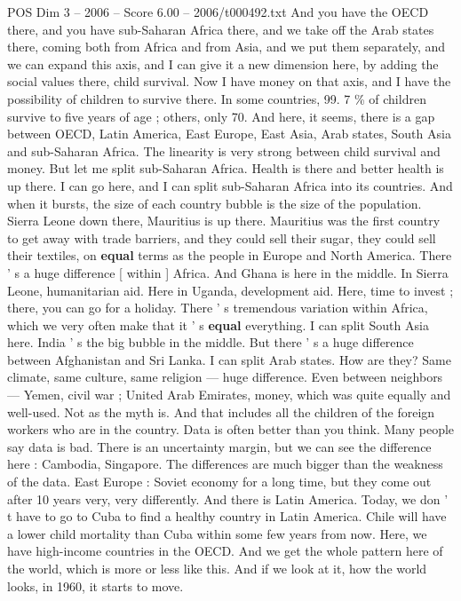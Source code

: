 \begin{textsample}{POS Dim 3 – 2006 – Score 6.00 – 2006/t000492.txt}
And you have the OECD there, and you have sub-Saharan Africa there, and we take off the Arab states there, coming both from Africa and from Asia, and we put them separately, and we can expand this axis, and I can give it a new dimension here, by adding the social values there, child survival.
Now I have money on that axis, and I have the possibility of children to survive there.
In some countries, 99. 7 \% of children survive to five years of age ; others, only 70.
And here, it seems, there is a gap between OECD, Latin America, East Europe, East Asia, Arab states, South Asia and sub-Saharan Africa.
The linearity is very strong between child survival and money.
But let me split sub-Saharan Africa.
Health is there and better health is up there.
I can go here, and I can split sub-Saharan Africa into its countries.
And when it bursts, the size of each country bubble is the size of the population.
Sierra Leone down there, Mauritius is up there.
Mauritius was the first country to get away with trade barriers, and they could sell their sugar, they could sell their textiles, on \textbf{equal} terms as the people in Europe and North America.
There ' s a huge difference [ within ] Africa.
And Ghana is here in the middle.
In Sierra Leone, humanitarian aid.
Here in Uganda, development aid.
Here, time to invest ; there, you can go for a holiday.
There ' s tremendous variation within Africa, which we very often make that it ' s \textbf{equal} everything.
I can split South Asia here.
India ' s the big bubble in the middle.
But there ' s a huge difference between Afghanistan and Sri Lanka.
I can split Arab states.
How are they?
Same climate, same culture, same religion — huge difference.
Even between neighbors — Yemen, civil war ; United Arab Emirates, money, which was quite equally and well-used.
Not as the myth is.
And that includes all the children of the foreign workers who are in the country.
Data is often better than you think.
Many people say data is bad.
There is an uncertainty margin, but we can see the difference here : Cambodia, Singapore.
The differences are much bigger than the weakness of the data.
East Europe : Soviet economy for a long time, but they come out after 10 years very, very differently.
And there is Latin America.
Today, we don ' t have to go to Cuba to find a healthy country in Latin America.
Chile will have a lower child mortality than Cuba within some few years from now.
Here, we have high-income countries in the OECD.
And we get the whole pattern here of the world, which is more or less like this.
And if we look at it, how the world looks, in 1960, it starts to move.

\end{textsample}
